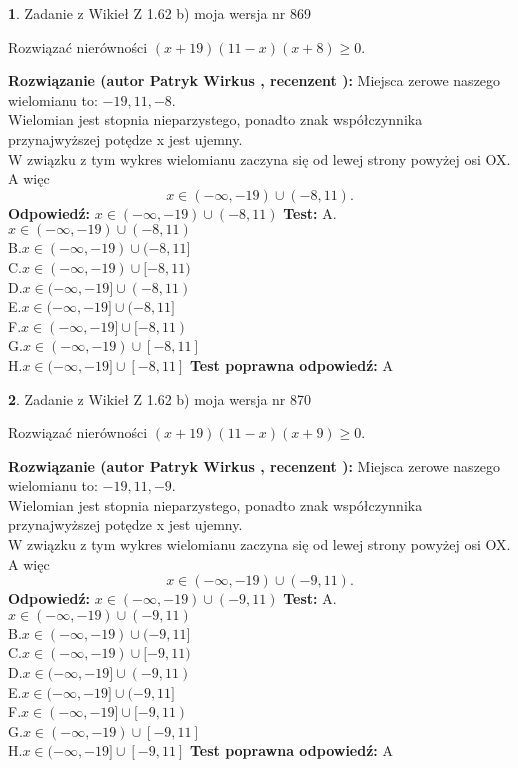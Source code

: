 \documentclass[12pt, a4paper]{article}
\theoremstyle{definition} %
\newtheorem{zad}{}
\newcommand{\zadStart}[1]{\begin{zad}#1\newline}
\newcommand{\zadStop}{\end{zad}}
\newcommand{\rozwStart}[2]{\noindent \textbf{Rozwiązanie (autor #1 , recenzent #2): }\newline}
\newcommand{\rozwStop}{\newline}
\newcommand{\odpStart}{\noindent \textbf{Odpowiedź:}\newline}
\newcommand{\odpStop}{\newline}
\newcommand{\testStart}{\noindent \textbf{Test:}\newline}
\newcommand{\testStop}{\newline}
\newcommand{\kluczStart}{\noindent \textbf{Test poprawna odpowiedź:}\newline}
\newcommand{\kluczStop}{\newline}
\begin{document}
\zadStart{Zadanie z Wikieł Z 1.62 b) moja wersja nr 869}

Rozwiązać nierówności $(x+19)(11-x)(x+8)\ge0$.
\zadStop
\rozwStart{Patryk Wirkus}{}
Miejsca zerowe naszego wielomianu to: $-19, 11, -8$.\\
Wielomian jest stopnia nieparzystego, ponadto znak współczynnika przy\linebreak najwyższej potędze x jest ujemny.\\ W związku z tym wykres wielomianu zaczyna się od lewej strony powyżej osi OX. A więc $$x \in (-\infty,-19) \cup (-8,11).$$
\rozwStop
\odpStart
$x \in (-\infty,-19) \cup (-8,11)$
\odpStop
\testStart
A.$x \in (-\infty,-19) \cup (-8,11)$\\
B.$x \in (-\infty,-19) \cup (-8,11]$\\
C.$x \in (-\infty,-19) \cup [-8,11)$\\
D.$x \in (-\infty,-19] \cup (-8,11)$\\
E.$x \in (-\infty,-19] \cup (-8,11]$\\
F.$x \in (-\infty,-19] \cup [-8,11)$\\
G.$x \in (-\infty,-19) \cup [-8,11]$\\
H.$x \in (-\infty,-19] \cup [-8,11]$
\testStop
\kluczStart
A
\kluczStop



\zadStart{Zadanie z Wikieł Z 1.62 b) moja wersja nr 870}

Rozwiązać nierówności $(x+19)(11-x)(x+9)\ge0$.
\zadStop
\rozwStart{Patryk Wirkus}{}
Miejsca zerowe naszego wielomianu to: $-19, 11, -9$.\\
Wielomian jest stopnia nieparzystego, ponadto znak współczynnika przy\linebreak najwyższej potędze x jest ujemny.\\ W związku z tym wykres wielomianu zaczyna się od lewej strony powyżej osi OX. A więc $$x \in (-\infty,-19) \cup (-9,11).$$
\rozwStop
\odpStart
$x \in (-\infty,-19) \cup (-9,11)$
\odpStop
\testStart
A.$x \in (-\infty,-19) \cup (-9,11)$\\
B.$x \in (-\infty,-19) \cup (-9,11]$\\
C.$x \in (-\infty,-19) \cup [-9,11)$\\
D.$x \in (-\infty,-19] \cup (-9,11)$\\
E.$x \in (-\infty,-19] \cup (-9,11]$\\
F.$x \in (-\infty,-19] \cup [-9,11)$\\
G.$x \in (-\infty,-19) \cup [-9,11]$\\
H.$x \in (-\infty,-19] \cup [-9,11]$
\testStop
\kluczStart
A
\kluczStop
\end{document}
